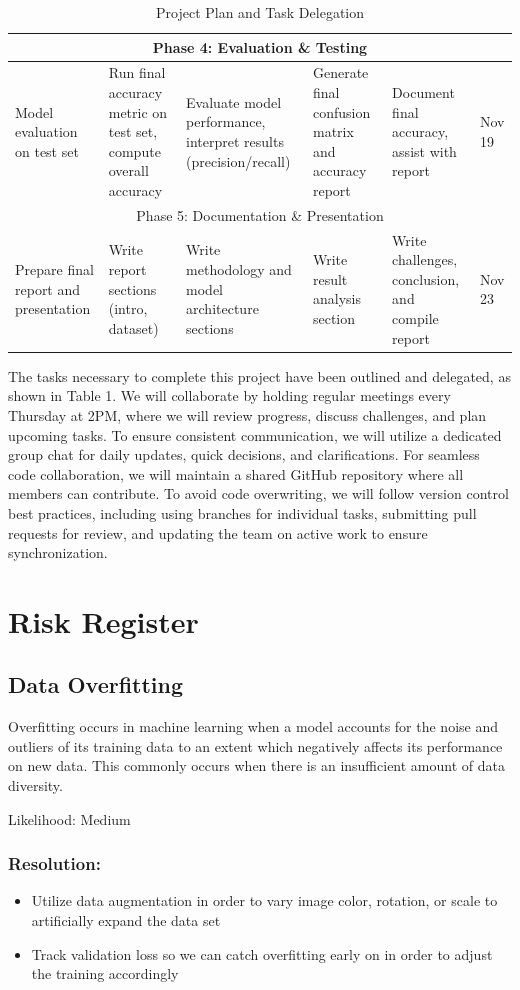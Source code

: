 \documentclass{article} %
\begin{document}
\begin{table} [h]
\begin{tabular}{|p{2.1cm}|p{2.5cm}|p{2.5cm}|p{2.5cm}|p{2.5cm}|p{1.3cm}|}
 \multicolumn{6}{|c|}{Phase 4: Evaluation \& Testing}\\ \hline 
 Model evaluation on test set& Run final accuracy metric on test set, compute overall accuracy& Evaluate model performance, interpret results (precision/recall)& Generate final confusion matrix and accuracy report& Document final accuracy, assist with report&Nov 19\\ \hline 
 \multicolumn{6}{|c|}{Phase 5: Documentation \& Presentation}\\ \hline 
         Prepare final report and presentation&  Write report sections (intro, dataset)&  Write methodology and model architecture sections&  Write result analysis section&  Write challenges, conclusion, and compile report& Nov 23\\ \hline
    \end{tabular}
    
    \caption{Project Plan and Task Delegation}
    \label{tab:my_label}
\end{table}

The tasks necessary to complete this project have been outlined and delegated, as shown in Table 1. We will collaborate by holding regular meetings every Thursday at 2PM, where we will review progress, discuss challenges, and plan upcoming tasks. To ensure consistent communication, we will utilize a dedicated group chat for daily updates, quick decisions, and clarifications. For seamless code collaboration, we will maintain a shared GitHub repository where all members can contribute. To avoid code overwriting, we will follow version control best practices, including using branches for individual tasks, submitting pull requests for review, and updating the team on active work to ensure synchronization.

\section{Risk Register}
\subsection{Data Overfitting}
Overfitting occurs in machine learning when a model accounts for the noise and outliers of its training data to an extent which negatively affects its performance on new data. This commonly occurs when there is an insufficient amount of data diversity. 

Likelihood: Medium

\subsubsection*{Resolution:}
\begin{itemize}
    \item Utilize data augmentation in order to vary image color, rotation, or scale to artificially expand the data set 
    \item Track validation loss so we can catch overfitting early on in order to adjust the training accordingly 
\end{itemize}
\end{document}
